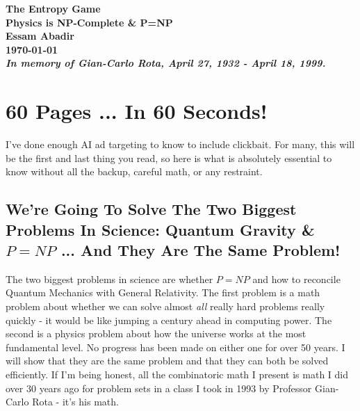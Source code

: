\documentclass{report}
\makeatletter
\renewcommand\part{\if@openright\clearpage\else\clearpage\fi
  \thispagestyle{plain}%
  \if@twocolumn
    \onecolumn
    \@tempswatrue
  \else
    \@tempswafalse
  \fi
  \null\vfil
  \secdef\@part\@spart}
\makeatother
\begin{document}
\begin{titlepage} %
    \centering
    \vspace*{\fill} %
    \Huge\bfseries The Entropy Game\\
    \Large Physics is NP-Complete \& P=NP\\
    \vspace{1cm}
    \Large Essam Abadir\\
    \vspace{1cm}
    \large \today\\

    \vspace{3cm}
    \normalfont \emph{In memory of Gian-Carlo Rota, April 27, 1932 - April 18, 1999.}
    \vspace*{\fill} %
    
\end{titlepage}

\tableofcontents
\clearpage %

\part{Beforehand}

\section*{60 Pages ... In 60 Seconds!}
I've done enough AI ad targeting to know to include clickbait. For many, this will be the first and last thing you read, so here is what is absolutely essential to know without all the backup, careful math, or any restraint.

\subsection*{We're Going To Solve The Two Biggest Problems In Science: Quantum Gravity \& $P=NP$ ... And They Are The Same Problem!}
The two biggest problems in science are whether \(P=NP\) and how to reconcile Quantum Mechanics with General Relativity. The first problem is a math problem about whether we can solve almost \emph{all} really hard problems really quickly - it would be like jumping a century ahead in computing power. The second is a physics problem about how the universe works at the most fundamental level. No progress has been made on either one for over 50 years\cite{jaimungal2021wrong}\cite{jaimungal2021crisis}\cite{jaimungal2021gravitise}\cite{50yearsofPvsNP}\cite{Rota1985}\cite{Aaronson2013}\cite{aaronson2021odds}\cite{jaimungal2021greatest}. I will show that they are the same problem and that they can both be solved efficiently. If I'm being honest, all the combinatoric math I present is math I did over 30 years ago for problem sets in a class I took in 1993 by Professor Gian-Carlo Rota - it's his math.
\end{document}
